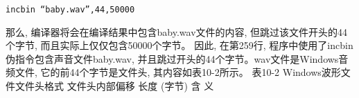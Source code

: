 \documentclass[12pt]{article}
\begin{document}
\begin{CJK}{UTF8}{gbsn}
\begin{verbatim}
incbin “baby.wav”,44,50000
\end{verbatim}

那么, 编译器将会在编译结果中包含baby.wav文件的内容, 但跳过该文件开头的44个字节, 而且实际上仅仅包含50000个字节。
因此, 在第259行, 程序中使用了incbin伪指令包含声音文件baby.wav, 并且跳过开头的44个字节。wav文件是Windows音频文件, 它的前44个字节是文件头, 其内容如表10-2所示。
表10-2  Windows波形文件文件头格式
文件头内部偏移	长度 (字节) 	含    义
\begin{comment}
0x00	4	字符串“RIFF”
0x04	4	文件长度
0x08	4	字符串“WAVE”
0x0c	4	字符串“fmt ”, 该串表明这里是音频格式部分的开始
0x10	4	音频格式部分的长度
0x14	2	编码格式 (0x01：PCM) 
0x16	2	声道数量
0x18	4	采样率 (样本生成速度, 即, 采样次数/秒) 
0x1c	4	数据率 (采样或回放时, 每秒的字节数) 
0x20	2	数据块大小 (样本宽度/8 ×声道数) 
0x22	2	样本宽度 (8、16或者32, 指每个样本的比特数) 
0x24	4	字符串“data”, 该串表明这里是音频数据部分的开始
0x28	4	实际的数字音频数据长度

讲述wav文件的文件头格式时, 结合一个实际的例子可能是个好主意。好吧, 让我们来看看本书中用到的baby.wav。用配书工具hexview打开它, 显示的内容如图10-8所示。
 
图10-8  以十六进制形式显示的baby.wav文件内容


\end{comment}
\end{CJK}
\end{document}
